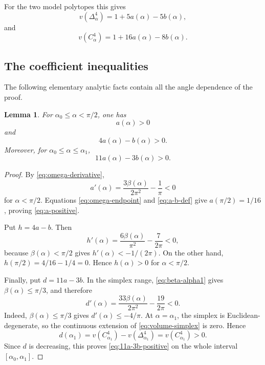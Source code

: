 \documentclass[12pt,a4paper]{article}
\theoremstyle{thmstyleone}
\newtheorem{lemma}[theorem]{Lemma}
\theoremstyle{thmstylethree}
\theoremstyle{thmstyletwo}
\begin{document}
For the two model polytopes this gives
\begin{equation}\label{eq:volume-simplex}
 v(\Delta^4_\alpha)=1+5a(\alpha)-5b(\alpha),
\end{equation}
and
\begin{equation}\label{eq:volume-cube}
 v(C^4_\alpha)=1+16a(\alpha)-8b(\alpha).
\end{equation}

\subsection{The coefficient inequalities}

The following elementary analytic facts contain all the angle dependence of
the proof.

\begin{lemma}\label{lem:coefficients}
For $\alpha_0\leq\alpha<\pi/2$, one has
\begin{equation}\label{eq:a-positive}
 a(\alpha)>0
\end{equation}
and
\begin{equation}\label{eq:4a-b-positive}
 4a(\alpha)-b(\alpha)>0.
\end{equation}
Moreover, for $\alpha_0\leq\alpha\leq\alpha_1$,
\begin{equation}\label{eq:11a-3b-positive}
 11a(\alpha)-3b(\alpha)>0.
\end{equation}
\end{lemma}

\begin{proof}
By \eqref{eq:omega-derivative},
\[
 a'(\alpha)=\frac{3\beta(\alpha)}{2\pi^2}-\frac1\pi<0
\]
for $\alpha<\pi/2$.  Equations \eqref{eq:omega-endpoint} and
\eqref{eq:a-b-def} give $a(\pi/2)=1/16$, proving
\eqref{eq:a-positive}.

Put $h=4a-b$.  Then
\[
 h'(\alpha)=\frac{6\beta(\alpha)}{\pi^2}-\frac{7}{2\pi}<0,
\]
because $\beta(\alpha)<\pi/2$ gives
$h'(\alpha)<-1/(2\pi)$.  On the other hand,
$h(\pi/2)=4/16-1/4=0$.  Hence $h(\alpha)>0$ for
$\alpha<\pi/2$.

Finally, put $d=11a-3b$.  In the simplex range,
\eqref{eq:beta-alpha1} gives $\beta(\alpha)\leq\pi/3$, and therefore
\[
 d'(\alpha)=\frac{33\beta(\alpha)}{2\pi^2}
 -\frac{19}{2\pi}<0.
\]
Indeed, $\beta(\alpha)\leq\pi/3$ gives
$d'(\alpha)\leq-4/\pi$.
At $\alpha=\alpha_1$, the simplex is Euclidean-degenerate, so the continuous
extension of \eqref{eq:volume-simplex} is zero.  Hence
\[
 d(\alpha_1)=v(C^4_{\alpha_1})-v(\Delta^4_{\alpha_1})
 =v(C^4_{\alpha_1})>0.
\]
Since $d$ is decreasing, this proves \eqref{eq:11a-3b-positive} on the whole
interval $[\alpha_0,\alpha_1]$.
\end{proof}
\end{document}
